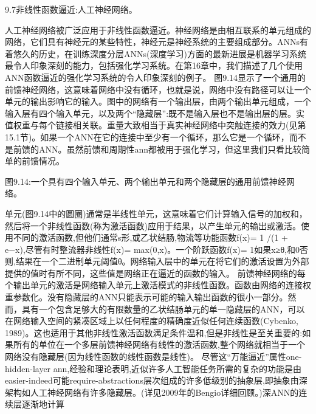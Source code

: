{9.7非线性函数逼近:人工神经网络。

人工神经网络被广泛应用于非线性函数逼近。神经网络是由相互联系的单元组成的网络，它们具有神经元的某些特性，神经元是神经系统的主要组成部分。ANNs有着悠久的历史，在训练深度分层ANNs(深度学习)方面的最新进展是机器学习系统最令人印象深刻的能力，包括强化学习系统。在第16章中，我们描述了几个使用ANN函数逼近的强化学习系统的令人印象深刻的例子。
图9.14显示了一个通用的前馈神经网络，这意味着网络中没有循环，也就是说，网络中没有路径可以让一个单元的输出影响它的输入。图中的网络有一个输出层，由两个输出单元组成，一个输入层有四个输入单元，以及两个“隐藏层”:既不是输入层也不是输出层的层。实值权重与每个链接相关联。重量大致相当于真实神经网络中突触连接的效力(见第15.1节)。如果一个ANN在它的连接中至少有一个循环，那么它是一个循环，而不是前馈的ANN。虽然前馈和周期性ann都被用于强化学习，但这里我们只看比较简单的前馈情况。
 
图9.14:一个具有四个输入单元、两个输出单元和两个隐藏层的通用前馈神经网络。



单元(图9.14中的圆圈)通常是半线性单元，这意味着它们计算输入信号的加权和，然后将一个非线性函数(称为激活函数)应用于结果，以产生单元的输出或激活。使用不同的激活函数,但他们通常s形,或乙状结肠,物流等功能函数f(x)= 1 /(1 + e−x),尽管有时整流器非线性f(x)= max(0,x)。一个阶跃函数f(x)= 1如果x≥θ,和0否则,结果在一个二进制单元阈值θ。网络输入层中的单元在将它们的激活设置为外部提供的值时有所不同，这些值是网络正在逼近的函数的输入。
前馈神经网络的每个输出单元的激活是网络输入单元上激活模式的非线性函数。函数由网络的连接权重参数化。没有隐藏层的ANN只能表示可能的输入输出函数的很小一部分。然而，具有一个包含足够大的有限数量的乙状结肠单元的单一隐藏层的ANN，可以在网络输入空间的紧凑区域上以任何程度的精确度近似任何连续函数(Cybenko, 1989)。这也适用于其他非线性激活函数满足条件温和,但是非线性是至关重要的:如果所有的单位在一个多层前馈神经网络有线性的激活函数,整个网络就相当于一个网络没有隐藏层(因为线性函数的线性函数是线性)。
尽管这“万能逼近”属性one-hidden-layer ann,经验和理论表明,近似许多人工智能任务所需的复杂的功能是由easier-indeed可能require-abstractions层次组成的许多低级别的抽象层,即抽象由深架构如人工神经网络有许多隐藏层。(详见2009年的Bengio详细回顾。)深ANN的连续层逐渐地计算

}
